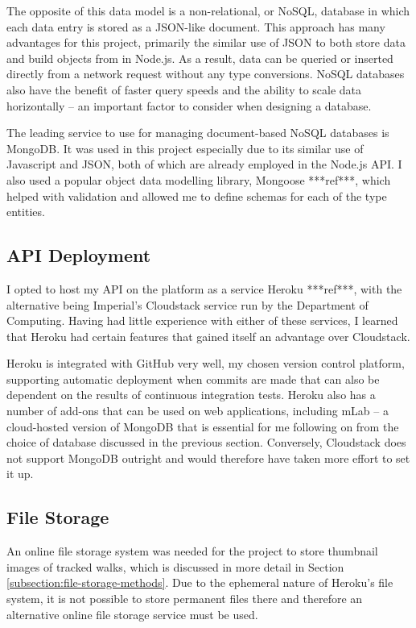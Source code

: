 The opposite of this data model is a non-relational, or NoSQL, database in which each data entry is stored as a JSON-like document. This approach has many advantages for this project, primarily the similar use of JSON to both store data and build objects from in Node.js. As a result, data can be queried or inserted directly from a network request without any type conversions. NoSQL databases also have the benefit of faster query speeds and the ability to scale data horizontally -- an important factor to consider when designing a database.

The leading service to use for managing document-based NoSQL databases is MongoDB. It was used in this project especially due to its similar use of Javascript and JSON, both of which are already employed in the Node.js API. I also used a popular object data modelling library, Mongoose ***ref***, which helped with validation and allowed me to define schemas for each of the type entities.

\subsection{API Deployment}

I opted to host my API on the platform as a service Heroku ***ref***, with the alternative being Imperial's Cloudstack service run by the Department of Computing. Having had little experience with either of these services, I learned that Heroku had certain features that gained itself an advantage over Cloudstack.

Heroku is integrated with GitHub very well, my chosen version control platform, supporting automatic deployment when commits are made that can also be dependent on the results of continuous integration tests. Heroku also has a number of add-ons that can be used on web applications, including mLab -- a cloud-hosted version of MongoDB that is essential for me following on from the choice of database discussed in the previous section. Conversely, Cloudstack does not support MongoDB outright and would therefore have taken more effort to set it up.

\subsection{File Storage}

An online file storage system was needed for the project to store thumbnail images of tracked walks, which is discussed in more detail in Section \ref{subsection:file-storage-methods}. Due to the ephemeral nature of Heroku's file system, it is not possible to store permanent files there and therefore an alternative online file storage service must be used.


